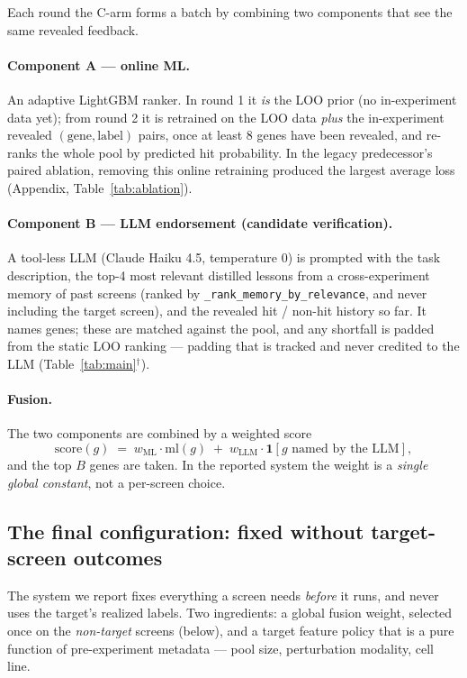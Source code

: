 \documentclass[11pt]{article}
\begin{document}
Each round the C-arm forms a batch by combining two components that see the same revealed feedback.

\paragraph{Component A --- online ML.} An adaptive LightGBM ranker. In round 1 it \emph{is} the LOO
prior (no in-experiment data yet); from round 2 it is retrained on the LOO data \emph{plus} the
in-experiment revealed $(\text{gene}, \text{label})$ pairs, once at least $8$ genes have been revealed,
and re-ranks the whole pool by predicted hit probability. In the legacy predecessor's paired ablation,
removing this online retraining produced the largest average loss (Appendix, Table~\ref{tab:ablation}).

\paragraph{Component B --- LLM endorsement (candidate verification).} A tool-less LLM (Claude Haiku 4.5,
temperature $0$) is
prompted with the task description, the top-4 most relevant distilled lessons from a cross-experiment
memory of past screens (ranked by \texttt{\_rank\_memory\_by\_relevance}, and never including the target
screen), and the revealed hit / non-hit history so far. It names genes; these are matched against the
pool, and any shortfall is padded from the static LOO ranking --- padding that is tracked and never
credited to the LLM (Table~\ref{tab:main}$^\dagger$).

\paragraph{Fusion.} The two components are combined by a weighted score
\[
  \mathrm{score}(g) \;=\; w_{\mathrm{ML}}\cdot \mathrm{ml}(g) \;+\; w_{\mathrm{LLM}}\cdot \mathbf{1}[g \text{ named by the LLM}],
\]
and the top $B$ genes are taken. In the reported system the weight is a \emph{single global constant},
not a per-screen choice.

\subsection*{The final configuration: fixed without target-screen outcomes}

The system we report fixes everything a screen needs \emph{before} it runs, and never uses the target's
realized labels. Two ingredients: a global fusion weight, selected once on the \emph{non-target} screens
(below), and a target feature policy that is a pure function of pre-experiment metadata --- pool size,
perturbation modality, cell line.
\end{document}
